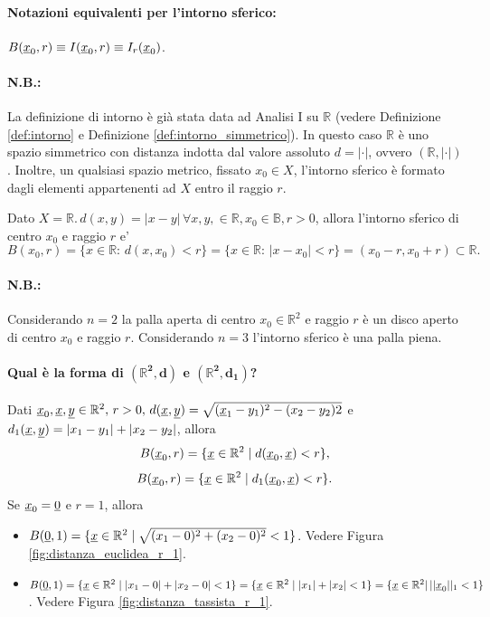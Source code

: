 \paragraph{Notazioni equivalenti per l'intorno sferico:} $B(\uline x_0, r)\equiv I(\uline x_0, r)\equiv I_r(\uline x_0)$.

\paragraph{N.B.:} La definizione di intorno è già stata data ad Analisi I su $\mathbb R$ (vedere Definizione \ref{def:intorno} e Definizione \ref{def:intorno_simmetrico}). In questo caso $\mathbb R$ è uno spazio simmetrico con distanza indotta dal valore assoluto $d=|\cdot|$, ovvero $(\mathbb R,|\cdot|)$. Inoltre, un qualsiasi spazio metrico, fissato $x_0\in X$, l'intorno sferico è formato dagli elementi appartenenti ad $X$ entro il raggio $r$.

\begin{example}
    Dato $X=\mathbb R.\, d(x,y)=|x-y|\,\forall x,y,\in\mathbb R, x_0\in\mathbb B, r>0$, allora l'intorno sferico di centro $x_0$ e raggio $r$ e'
    \begin{equation*}
        B(x_0,r)=\{x\in\mathbb R\colon\,d(x,x_0)<r\}=\{x\in\mathbb R\colon\,|x-x_0|<r\}=(x_0 - r, x_0 + r)\subset\mathbb R.
    \end{equation*}
\end{example}

\paragraph{N.B.:} Considerando $n=2$ la palla aperta di centro $x_0\in\mathbb R^2$ e raggio $r$ è un disco aperto di centro $x_0$ e raggio $r$. Considerando $n=3$ l'intorno sferico è una palla piena.

\paragraph{Qual è la forma di $\boldsymbol{(\mathbb R^2, d)}$ e $\boldsymbol{(\mathbb R^2, d_1)}$?}
Dati $\uline x_0, \uline x, \uline y\in\mathbb R^2,\, r>0,\, d(\uline x, \uline y)=\sqrt{(\uline x_1-y_1)^2-(x_2-y_2)2}$ e $ d_1(\uline x,\uline y)=|x_1-y_1|+|x_2-y_2|$, allora 
\begin{equation*}
    B(\uline x_0,r)=\{\uline x\in\mathbb R^2\; | \; d(\uline x_0, \uline x)<r\},
\end{equation*}
\begin{equation*}
    B(\uline x_0,r)=\{\uline x\in\mathbb R^2\; |\; d_1(\uline x_0, \uline x)<r\}.
\end{equation*}
Se $\uline x_0=\uline 0$ e $r=1$, allora
\begin{itemize}
    \item $B(\uline 0, 1)=\{\uline x\in\mathbb R^2\; |\;\sqrt{(x_1-0)^2+(x_2-0)^2}<1\}$. Vedere Figura \ref{fig:distanza_euclidea_r_1}.
    \item $B(\uline 0, 1)=\{\uline x\in\mathbb R^2\; |\; |x_1-0|+|x_2-0|<1\}=\{\uline x\in\mathbb R^2\; |\;|x_1|+|x_2|<1\}=\{\uline x\in\mathbb R^2|\,||\uline x_0||_1<1\}$. Vedere Figura \ref{fig:distanza_tassista_r_1}.
\end{itemize}

